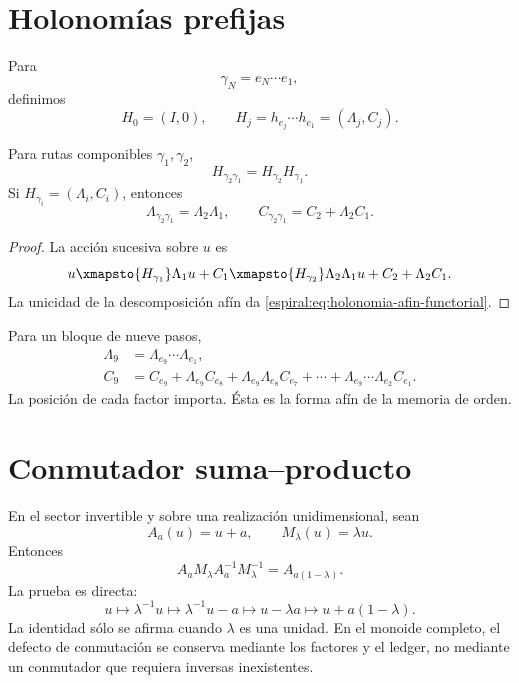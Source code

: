 \section{Holonomías prefijas}

Para
\[
 \gamma_N=e_N\cdots e_1,
\]
definimos
\[
 H_0=(I,0),\qquad
 H_j=h_{e_j}\cdots h_{e_1}=(\Lambda_j,C_j).
\]

\begin{theorem}
Para rutas componibles \(\gamma_1,\gamma_2\),
\[
 H_{\gamma_2\gamma_1}=H_{\gamma_2}H_{\gamma_1}.
\]
Si \(H_{\gamma_i}=(\Lambda_i,C_i)\), entonces
\begin{equation}
 \Lambda_{\gamma_2\gamma_1}=\Lambda_2\Lambda_1,
 \qquad
 C_{\gamma_2\gamma_1}=C_2+\Lambda_2C_1.
 \label{espiral:eq:holonomia-afin-functorial}
\end{equation}
\end{theorem}
\begin{proof}
La acción sucesiva sobre \(u\) es
\[
 u\xmapsto{H_{\gamma_1}}\Lambda_1u+C_1
 \xmapsto{H_{\gamma_2}}
 \Lambda_2\Lambda_1u+C_2+\Lambda_2C_1.
\]
La unicidad de la descomposición afín da \cref{espiral:eq:holonomia-afin-functorial}.
\end{proof}

Para un bloque de nueve pasos,
\begin{align}
 \Lambda_9&=\Lambda_{e_9}\cdots\Lambda_{e_1},\\
 C_9&=C_{e_9}+\Lambda_{e_9}C_{e_8}
 +\Lambda_{e_9}\Lambda_{e_8}C_{e_7}+\cdots
 +\Lambda_{e_9}\cdots\Lambda_{e_2}C_{e_1}.
 \label{espiral:eq:traslacion-nueve}
\end{align}
La posición de cada factor importa. Ésta es la forma afín de la memoria de
orden.

\section{Conmutador suma--producto}

En el sector invertible y sobre una realización unidimensional, sean
\[
 A_a(u)=u+a,\qquad M_\lambda(u)=\lambda u.
\]
Entonces
\begin{equation}
 A_aM_\lambda A_a^{-1}M_\lambda^{-1}
 =A_{a(1-\lambda)}.
 \label{espiral:eq:conmutador-afin}
\end{equation}
La prueba es directa:
\[
 u\mapsto\lambda^{-1}u\mapsto\lambda^{-1}u-a
 \mapsto u-\lambda a\mapsto u+a(1-\lambda).
\]
La identidad sólo se afirma cuando \(\lambda\) es una unidad. En el monoide
completo, el defecto de conmutación se conserva mediante los factores y el
ledger, no mediante un conmutador que requiera inversas inexistentes.

